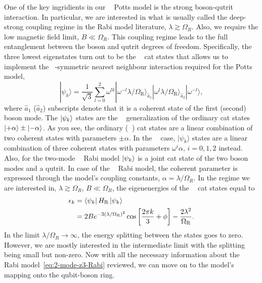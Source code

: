 \documentclass[reprint, aps, prx, amsmath, amssymb, longbibliography, superscriptaddress]{revtex4-2}
\DeclareMathOperator{\Zthree}{\mathbb{Z}_3}
\DeclareMathOperator{\Ztwo}{\mathbb{Z}_2}
\begin{document}
One of the key ingridients in our $\Zthree$ Potts model is the strong boson-qutrit interaction. In particular, we are interested in what is usually called the deep-strong coupling regime in the Rabi model literature, $\lambda \gtrsim \Omega_R$. Also, we require the low magnetic field limit, $ B \ll \Omega_R$. This coupling regime leads to the full entanglement between the boson and qutrit degrees of freedom. Specifically, the three lowest eigenstates turn out to be the $\Zthree$ cat states \cite{lotkov_cat_} that allows us to implement the $\Zthree$-symmetric nearest neighbour interaction required for the Potts model,
\begin{equation}
\label{eq:three-cat-states}
    |\psi_k\rangle = \frac{1}{\sqrt{3}}\sum\limits_{l=0}^2 \omega^{lk}|\omega^{-l} \lambda/\Omega_{\text{R}}\rangle_{\hat a_1}|\omega^l \lambda/\Omega_{\text{R}}\rangle_{\hat a_2} |\omega^{-l} \rangle,
\end{equation}
where $\hat a_1$ ($\hat a_2$) subscripts denote that it is a coherent state of the first (second) boson mode.  The $\ket{\psi_k}$ states are the $\Zthree$ generalization of the ordinary cat states $\ket{+\alpha} \pm \ket{-\alpha}$. As you see, the ordinary ($\Ztwo$) cat states are a linear combination of two coherent states with parameters $\pm\alpha$. In the $\Zthree$ case, $|\psi_k\rangle$ states are a linear combination of three coherent states with parameters $\omega^i \alpha, \, i = 0,1,2$ instead. Also, for the two-mode $\Zthree$ Rabi model $\ket{\psi_k}$ is a joint cat state of the two boson modes and a qutrit. In case of the $\Zthree$ Rabi model, the coherent parameter is expressed through the model's coupling constants, $\alpha = \lambda/\Omega_R$. In the regime we are interested in, $\lambda \gtrsim \Omega_R$, $ B \ll \Omega_R$, the eigenenergies of the $\Zthree$ cat states equal to
\begin{equation}
\begin{aligned}
\label{eq:rabi-spectrum}
    \epsilon_k &= \bra{\psi_k}H_{\text{R}} \ket{\psi_k} \\
    &= 2 B e^{-3(\lambda/\Omega_{\text{R}})^2}\cos\left[\frac{2\pi k}{3} + \phi\right] - \frac{2\lambda^2}{\Omega_{\text{R}}}.
\end{aligned}
\end{equation}
In the limit $\lambda/\Omega_R \to \infty$, the energy splitting between the states goes to zero. However, we are mostly interested in the intermediate limit with the splitting being small but non-zero. Now with all the necessary information about the $\Zthree$ Rabi model~\eqref{eq:2-mode-z3-Rabi} reviewed, we can move on to the model's mapping onto the qubit-boson ring.
\end{document}
